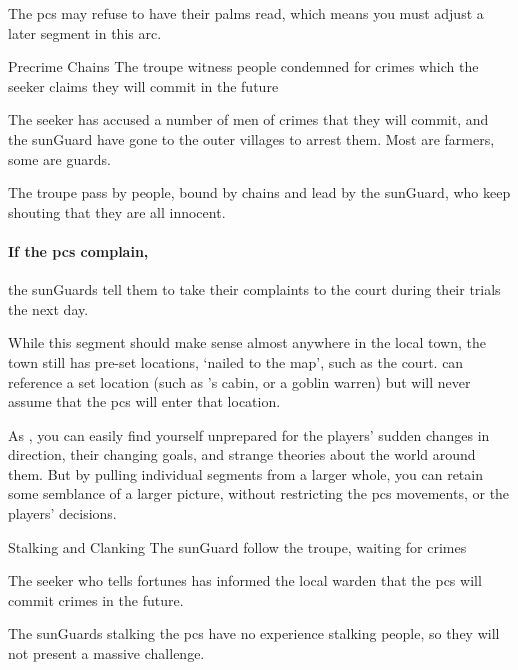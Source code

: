 \begin{multicols}{2}
The \glspl{pc} may refuse to have their palms read, which means you must adjust a later \gls{segment} in this arc.

{Precrime Chains}%
{The troupe witness people condemned for crimes which the \gls{seeker} claims they will commit in the future}%

\begin{exampletext}
  The \gls{seeker} has accused a number of men of crimes that they will commit, and the \gls{sunGuard} have gone to the outer \glspl{village} to arrest them.
  Most are farmers, some are \glspl{guard}.
\end{exampletext}

The troupe pass by people, bound by chains and lead by the \gls{sunGuard}, who keep shouting that they are all innocent.

\paragraph{If the \glspl{pc} complain,}
the \glspl{sunGuard} tell them to take their complaints to the \gls{court} during their trials the next day.

While this \gls{segment} should make sense almost anywhere in the local town, the town still has pre-set locations, `nailed to the map', such as the \gls{court}.
 can reference a set location (such as 's cabin, or a goblin warren) but will never assume that the \glspl{pc} will enter that location.

As , you can easily find yourself unprepared for the players' sudden changes in direction, their changing goals, and strange theories about the world around them.
But by pulling individual \glspl{segment} from a larger whole, you can retain some semblance of a larger picture, without restricting the \glspl{pc} movements, or the players' decisions.

{Stalking and Clanking}%
{The \gls{sunGuard} follow the troupe, waiting for crimes}%

\begin{exampletext}
  The \gls{seeker} who tells fortunes has informed the local \gls{warden} that the \glspl{pc} will commit crimes in the future.
\end{exampletext}

The \glspl{sunGuard} stalking the \glspl{pc} have no experience stalking people, so they will not present a massive challenge.


\end{multicols}
